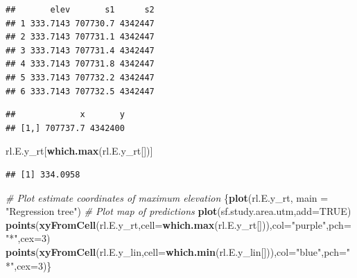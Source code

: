 \documentclass[
]{book}
\newenvironment{Shaded}{\begin{snugshade}}{\end{snugshade}}
\newcommand{\AttributeTok}[1]{\textcolor[rgb]{0.13,0.29,0.53}{#1}}
\newcommand{\CommentTok}[1]{\textcolor[rgb]{0.56,0.35,0.01}{\textit{#1}}}
\newcommand{\ConstantTok}[1]{\textcolor[rgb]{0.56,0.35,0.01}{#1}}
\newcommand{\DecValTok}[1]{\textcolor[rgb]{0.00,0.00,0.81}{#1}}
\newcommand{\FunctionTok}[1]{\textcolor[rgb]{0.13,0.29,0.53}{\textbf{#1}}}
\newcommand{\NormalTok}[1]{#1}
\newcommand{\OtherTok}[1]{\textcolor[rgb]{0.56,0.35,0.01}{#1}}
\newcommand{\SpecialCharTok}[1]{\textcolor[rgb]{0.81,0.36,0.00}{\textbf{#1}}}
\newcommand{\StringTok}[1]{\textcolor[rgb]{0.31,0.60,0.02}{#1}}
\begin{document}
\begin{verbatim}
##       elev       s1      s2
## 1 333.7143 707730.7 4342447
## 2 333.7143 707731.1 4342447
## 3 333.7143 707731.4 4342447
## 4 333.7143 707731.8 4342447
## 5 333.7143 707732.2 4342447
## 6 333.7143 707732.5 4342447
\end{verbatim}

\begin{Shaded}
\end{Shaded}

\begin{verbatim}
##             x       y
## [1,] 707737.7 4342400
\end{verbatim}

\begin{Shaded}
\begin{Highlighting}[]
\NormalTok{rl.E.y\_rt[}\FunctionTok{which.max}\NormalTok{(rl.E.y\_rt[])]}
\end{Highlighting}
\end{Shaded}

\begin{verbatim}
## [1] 334.0958
\end{verbatim}

\begin{Shaded}
\begin{Highlighting}[]
\CommentTok{\# Plot estimate coordinates of maximum elevation}
\NormalTok{\{}\FunctionTok{plot}\NormalTok{(rl.E.y\_rt, }\AttributeTok{main =} \StringTok{"Regression tree"}\NormalTok{) }\CommentTok{\# Plot map of predictions}
\FunctionTok{plot}\NormalTok{(sf.study.area.utm,}\AttributeTok{add=}\ConstantTok{TRUE}\NormalTok{)}
\FunctionTok{points}\NormalTok{(}\FunctionTok{xyFromCell}\NormalTok{(rl.E.y\_rt,}\AttributeTok{cell=}\FunctionTok{which.max}\NormalTok{(rl.E.y\_rt[])),}\AttributeTok{col=}\StringTok{"purple"}\NormalTok{,}\AttributeTok{pch=}\StringTok{"*"}\NormalTok{,}\AttributeTok{cex=}\DecValTok{3}\NormalTok{)}
\FunctionTok{points}\NormalTok{(}\FunctionTok{xyFromCell}\NormalTok{(rl.E.y\_lin,}\AttributeTok{cell=}\FunctionTok{which.min}\NormalTok{(rl.E.y\_lin[])),}\AttributeTok{col=}\StringTok{"blue"}\NormalTok{,}\AttributeTok{pch=}\StringTok{"*"}\NormalTok{,}\AttributeTok{cex=}\DecValTok{3}\NormalTok{)\}}
\end{Highlighting}
\end{Shaded}
\end{document}
